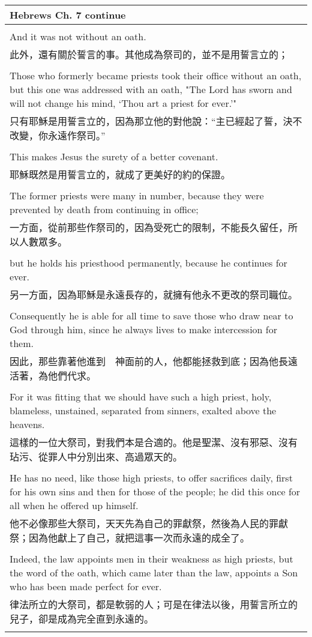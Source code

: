 \documentclass{book}
\begin{document}
\newpage
\begin{tabularx}{\textwidth}{p{}}
\hline
Hebrews Ch. 7 continue \\
\hline \\
And it was not without an oath. \\
此外，還有關於誓言的事。其他成為祭司的，並不是用誓言立的； \\ \\
Those who formerly became priests took their office without an oath, but this one was addressed with an oath, "The Lord has sworn and will not change his mind, `Thou art a priest for ever.'" \\
只有耶穌是用誓言立的，因為那立他的對他說：“主已經起了誓，決不改變，你永遠作祭司。” \\ \\
This makes Jesus the surety of a better covenant. \\
耶穌既然是用誓言立的，就成了更美好的約的保證。 \\ \\
The former priests were many in number, because they were prevented by death from continuing in office; \\
一方面，從前那些作祭司的，因為受死亡的限制，不能長久留任，所以人數眾多。 \\ \\
but he holds his priesthood permanently, because he continues for ever. \\
另一方面，因為耶穌是永遠長存的，就擁有他永不更改的祭司職位。 \\ \\
Consequently he is able for all time to save those who draw near to God through him, since he always lives to make intercession for them. \\
因此，那些靠著他進到　神面前的人，他都能拯救到底；因為他長遠活著，為他們代求。 \\ \\
For it was fitting that we should have such a high priest, holy, blameless, unstained, separated from sinners, exalted above the heavens. \\
這樣的一位大祭司，對我們本是合適的。他是聖潔、沒有邪惡、沒有玷污、從罪人中分別出來、高過眾天的。 \\ \\
He has no need, like those high priests, to offer sacrifices daily, first for his own sins and then for those of the people; he did this once for all when he offered up himself. \\
他不必像那些大祭司，天天先為自己的罪獻祭，然後為人民的罪獻祭；因為他獻上了自己，就把這事一次而永遠的成全了。 \\ \\
Indeed, the law appoints men in their weakness as high priests, but the word of the oath, which came later than the law, appoints a Son who has been made perfect for ever. \\
律法所立的大祭司，都是軟弱的人；可是在律法以後，用誓言所立的兒子，卻是成為完全直到永遠的。 \\ \\

\hline
\end{tabularx}
\end{document}
